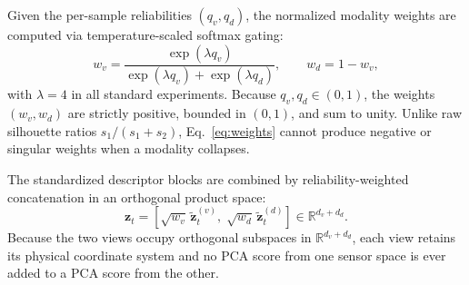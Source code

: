 \documentclass[11pt, a4paper]{article}
\begin{document}
Given the per-sample reliabilities $(q_v, q_d)$, the normalized modality weights are computed via temperature-scaled softmax gating:
\begin{equation}
w_v = \frac{\exp(\lambda q_v)}{\exp(\lambda q_v)+\exp(\lambda q_d)},
\qquad
w_d = 1-w_v,
\label{eq:weights}
\end{equation}
with $\lambda=4$ in all standard experiments. Because $q_v, q_d \in (0,1)$, the weights $(w_v, w_d)$ are strictly positive, bounded in $(0,1)$, and sum to unity. Unlike raw silhouette ratios $s_1/(s_1+s_2)$, Eq.~\eqref{eq:weights} cannot produce negative or singular weights when a modality collapses.

The standardized descriptor blocks are combined by reliability-weighted concatenation in an orthogonal product space:
\begin{equation}
\mathbf{z}_t =
\left[
\sqrt{w_v}\,\tilde{\mathbf{z}}^{(v)}_t,\;
\sqrt{w_d}\,\tilde{\mathbf{z}}^{(d)}_t
\right] \in \mathbb{R}^{d_v + d_d}.
\label{eq:fusion}
\end{equation}
Because the two views occupy orthogonal subspaces in $\mathbb{R}^{d_v + d_d}$, each view retains its physical coordinate system and no PCA score from one sensor space is ever added to a PCA score from the other.
\end{document}

